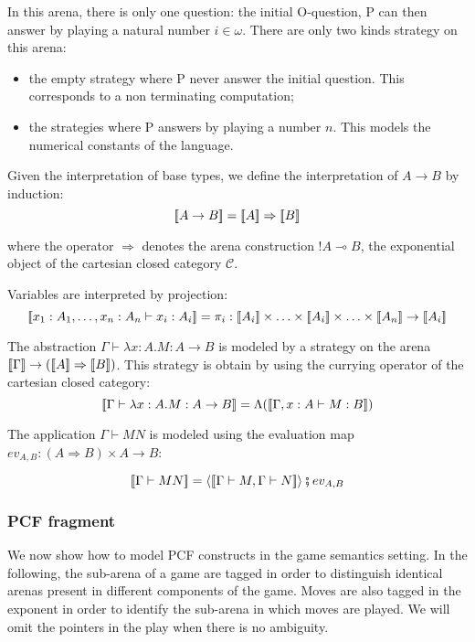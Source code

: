 In this arena, there is only one question: the initial O-question, P
can then answer by playing a natural number $i \in \omega$. There
are only two kinds strategy on this arena:
\begin{itemize}
\item the empty strategy where P never answer the initial question. This corresponds to a non terminating computation;
\item the strategies where P answers by playing a number $n$. This models the numerical constants of the language.
\end{itemize}

Given the interpretation of base types, we define the interpretation
of $A\rightarrow B$ by induction:
$${[\![ A \rightarrow B ]\!]} = {[\![ A ]\!]} \Rightarrow {[\![B ]\!]}$$

where the operator $\Rightarrow$ denotes the arena construction $!A
\multimap B$, the exponential object of the cartesian closed
category $\mathcal{C}$.



Variables are interpreted by projection:
$$\sem{x_1 : A_1, \ldots, x_n:A_n \vdash x_i : A_i} = \pi_i : \sem{A_i} \times \ldots \times \sem{A_i} \times \ldots \times \sem{A_n} \rightarrow  \sem{A_i}$$

The abstraction $\Gamma \vdash \lambda x :A.M : A \rightarrow B$ is
modeled by a strategy on the arena ${[\![ \Gamma ]\!]} \rightarrow
({[\![ A ]\!]}\Rightarrow{[\![B ]\!]})$. This strategy is obtain by using the
currying operator of the cartesian closed category:
$${[\![ \Gamma \vdash \lambda x :A.M : A \rightarrow B ]\!]} = \Lambda( {[\![ \Gamma, x :A \vdash M : B ]\!]})$$

The application $\Gamma \vdash M N$ is modeled using the evaluation
map $ev_{A,B} : (A\Rightarrow B)\times A \rightarrow B$:

$${[\![ \Gamma \vdash M N ]\!]} = \langle {[\![\Gamma \vdash M, \Gamma \vdash N ]\!]} \rangle \fatsemi ev_{A,B}$$


\subsubsection{PCF fragment}

We now show how to model PCF constructs in the game semantics
setting. In the following, the sub-arena of a game are tagged in
order to distinguish identical arenas present in different
components of the game. Moves are also tagged in the exponent in
order to identify the sub-arena in which moves are played. We will
omit the pointers in the play when there is no ambiguity.

